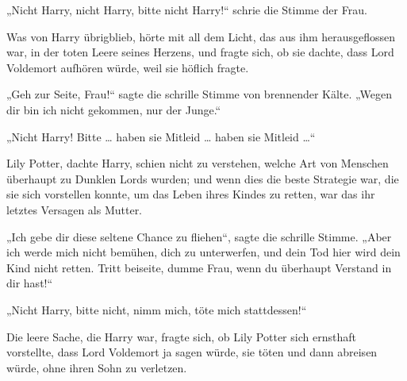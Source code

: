 \begin{em}
„Nicht Harry, nicht Harry, bitte nicht Harry!“ schrie die Stimme der Frau.

Was von Harry übrigblieb, hörte mit all dem Licht, das aus ihm herausgeflossen war, in der toten Leere seines Herzens, und fragte sich, ob sie dachte, dass Lord Voldemort aufhören würde, weil sie höflich fragte.

„Geh zur Seite, Frau!“ sagte die schrille Stimme von brennender Kälte.
„Wegen dir bin ich nicht gekommen, nur der Junge.“

„Nicht Harry! Bitte … haben sie Mitleid … haben sie Mitleid …“

Lily Potter, dachte Harry, schien nicht zu verstehen, welche Art von Menschen überhaupt zu Dunklen Lords wurden; und wenn dies die beste Strategie war, die sie sich vorstellen konnte, um das Leben ihres Kindes zu retten, war das ihr letztes Versagen als Mutter.

„Ich gebe dir diese seltene Chance zu fliehen“, sagte die schrille Stimme.
„Aber ich werde mich nicht bemühen, dich zu unterwerfen, und dein Tod hier wird dein Kind nicht retten. Tritt beiseite, dumme Frau, wenn du überhaupt Verstand in dir hast!“

„Nicht Harry, bitte nicht, nimm mich, töte mich stattdessen!“

Die leere Sache, die Harry war, fragte sich, ob Lily Potter sich ernsthaft vorstellte, dass Lord Voldemort ja sagen würde, sie töten und dann abreisen würde, ohne ihren Sohn zu verletzen.


\end{em}
